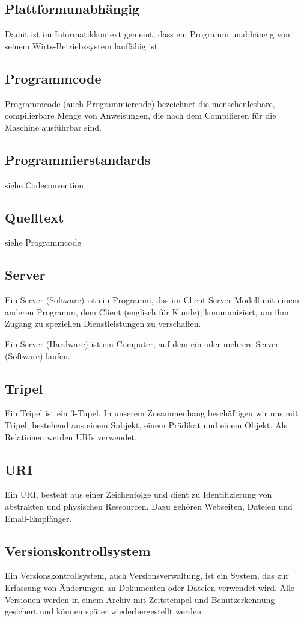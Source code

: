 \documentclass[11pt,a4paper]{article}
\begin{document}
\subsection{Plattformunabhängig} Damit ist im Informatikkontext gemeint, dass ein Programm unabhängig von seinem Wirts-Betriebssystem lauffähig ist.
\subsection{Programmcode} Programmcode (auch Programmiercode) bezeichnet die menschenlesbare, compilierbare Menge von Anweisungen, die nach dem Compilieren für die Maschine ausführbar sind.
\subsection{Programmierstandards}
siehe Codeconvention
\subsection{Quelltext}
siehe Programmcode
\subsection{Server}
Ein Server (Software) ist ein Programm, das im Client-Server-Modell mit einem anderen Programm, dem Client (englisch für Kunde), kommuniziert, um ihm Zugang zu speziellen Dienstleistungen zu verschaffen. \par\bigskip

Ein Server (Hardware) ist ein Computer, auf dem ein oder mehrere Server (Software) laufen.
\subsection{Tripel}
Ein Tripel ist ein 3-Tupel. In unserem Zusammenhang beschäftigen wir uns mit Tripel, bestehend aus einem Subjekt, einem Prädikat und einem Objekt. Als Relationen werden URIs verwendet.
\subsection{URI}
Ein URI, besteht aus einer  Zeichenfolge und dient zu Identifizierung von abstrakten und physischen  Ressourcen. Dazu gehören Webseiten, Dateien und Email-Empfänger.
\subsection{Versionskontrollsystem}
Ein Versionskontrollsystem, auch Versionsverwaltung, ist ein System, das zur Erfassung von Änderungen an Dokumenten oder Dateien verwendet wird. Alle Versionen werden in einem Archiv mit Zeitstempel und Benutzerkennung gesichert und können später wiederhergestellt werden.
\end{document}
